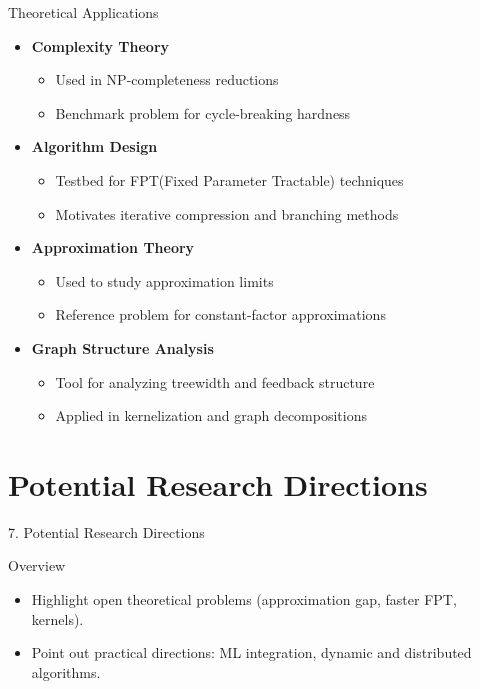 \documentclass[aspectratio=169]{beamer}
\begin{document}
\begin{frame}{Theoretical Applications}
	\begin{itemize}
		\item \textbf{Complexity Theory}
		      \begin{itemize}
			      \item Used in NP-completeness reductions
			      \item Benchmark problem for cycle-breaking hardness
		      \end{itemize}

		      \vspace{0.2cm}

		\item \textbf{Algorithm Design}
		      \begin{itemize}
			      \item Testbed for FPT(Fixed Parameter Tractable) techniques
			      \item Motivates iterative compression and branching methods
		      \end{itemize}

		      \vspace{0.2cm}

		\item \textbf{Approximation Theory}
		      \begin{itemize}
			      \item Used to study approximation limits
			      \item Reference problem for constant-factor approximations
		      \end{itemize}

		      \vspace{0.2cm}

		\item \textbf{Graph Structure Analysis}
		      \begin{itemize}
			      \item Tool for analyzing treewidth and feedback structure
			      \item Applied in kernelization and graph decompositions
		      \end{itemize}
	\end{itemize}
\end{frame}

\section{Potential Research Directions}

\begin{frame}{7. Potential Research Directions}
	\begin{block}{Overview}
		\begin{itemize}
			\item Highlight open theoretical problems (approximation gap, faster FPT, kernels).
			\item Point out practical directions: ML integration, dynamic and distributed algorithms.

		\end{itemize}
	\end{block}
\end{frame}
\end{document}
